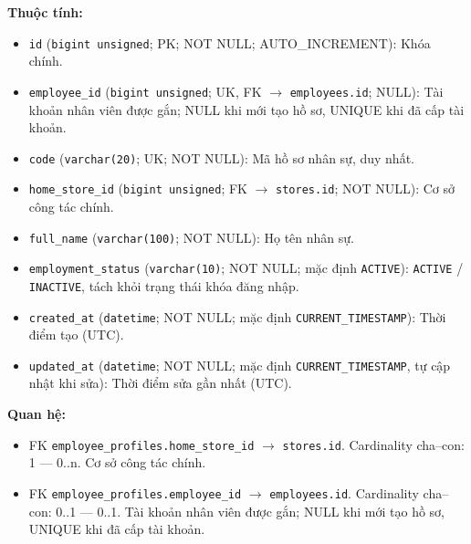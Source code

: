 \textbf{Thuộc tính:}

\begin{itemize}

\item \texttt{id} (\texttt{bigint unsigned}; PK; NOT NULL; AUTO_INCREMENT): Khóa chính.

\item \texttt{employee\_id} (\texttt{bigint unsigned}; UK, FK $\rightarrow$ \texttt{employees.id}; NULL): Tài khoản nhân viên được gắn; NULL khi mới tạo hồ sơ, UNIQUE khi đã cấp tài khoản.

\item \texttt{code} (\texttt{varchar(20)}; UK; NOT NULL): Mã hồ sơ nhân sự, duy nhất.

\item \texttt{home\_store\_id} (\texttt{bigint unsigned}; FK $\rightarrow$ \texttt{stores.id}; NOT NULL): Cơ sở công tác chính.

\item \texttt{full\_name} (\texttt{varchar(100)}; NOT NULL): Họ tên nhân sự.

\item \texttt{employment\_status} (\texttt{varchar(10)}; NOT NULL; mặc định \texttt{ACTIVE}): \texttt{ACTIVE} / \texttt{INACTIVE}, tách khỏi trạng thái khóa đăng nhập.

\item \texttt{created\_at} (\texttt{datetime}; NOT NULL; mặc định \texttt{CURRENT\_TIMESTAMP}): Thời điểm tạo (UTC).

\item \texttt{updated\_at} (\texttt{datetime}; NOT NULL; mặc định \texttt{CURRENT\_TIMESTAMP}, tự cập nhật khi sửa): Thời điểm sửa gần nhất (UTC).

\end{itemize}

\textbf{Quan hệ:}

\begin{itemize}

\item FK \texttt{employee\_profiles.home\_store\_id} $\rightarrow$ \texttt{stores.id}. Cardinality cha--con: 1 — 0..n. Cơ sở công tác chính.

\item FK \texttt{employee\_profiles.employee\_id} $\rightarrow$ \texttt{employees.id}. Cardinality cha--con: 0..1 — 0..1. Tài khoản nhân viên được gắn; NULL khi mới tạo hồ sơ, UNIQUE khi đã cấp tài khoản.

\end{itemize}

